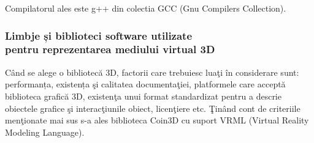 \par Compilatorul ales este g++ din colectia GCC (Gnu Compilers Collection). 

\subsubsection{Limbje și biblioteci software utilizate \\ pentru reprezentarea mediului virtual 3D}

\par Când se alege o bibliotecă 3D, factorii care trebuiesc luaţi în considerare sunt: performanța,
existența şi calitatea documentaţiei, platformele care acceptă biblioteca grafică 3D, existenţa unui
format standardizat pentru a descrie obiectele grafice şi interacţiunile obiect, licenţiere etc. Ţinând cont de criteriile menţionate mai sus s-a ales biblioteca Coin3D cu suport VRML (Virtual Reality Modeling
Language). 

